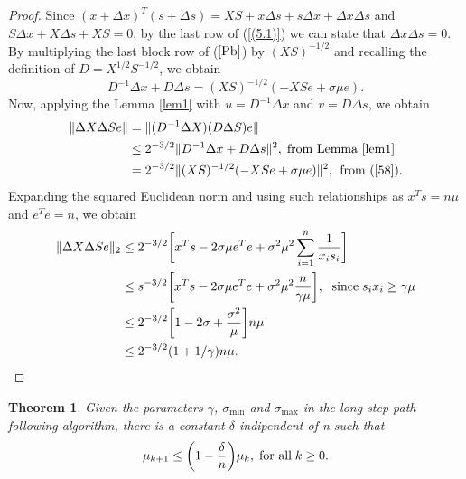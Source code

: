 \documentclass[a4paper,10 pt,titlepage,twoside]{book}
\theoremstyle{plain}
\newtheorem{thm}{Theorem}[chapter]
\theoremstyle{definition}
\theoremstyle{remark}
\begin{document}
\begin{proof}
	Since $(x + \Delta x)^{T}(s +\Delta s) = XS + x \Delta s + s \Delta x + \Delta x \Delta s$ and $S \Delta x + X \Delta s + XS = 0$, by the last row of (\ref{(5.1)}) we can state that $\Delta x\Delta s = 0$.\\
	By multiplying the last block row of ($\ref{Pb}$) by $(XS)^{-1/2}$ and recalling the definition of $D = X^{1/2}S^{-1/2}$, we obtain 
	\begin{equation}\label{58}
	D^{-1}\Delta x + D \Delta s = (XS)^{-1/2}(-XSe + \sigma \mu e).
	\end{equation}
	Now, applying the Lemma \ref{lem1} with $u= D^{-1}\Delta x$ and $v = D \Delta s$, we obtain
	\begin{align*}
	\lVert \Delta X \Delta S e\rVert &= \lVert(D^{-1}\Delta X)(D\Delta S)e \rVert \\
	&\leq 2^{-3/2}\lVert D^{-1}\Delta x + D \Delta s\rVert^{2}, \text{\;from Lemma \ref{lem1}}\\
	&= 2^{-3/2}\lVert (XS)^{-1/2}(-XSe + \sigma \mu e)\rVert ^{2} \text{,\; from (\ref{58})}.\\
	\end{align*}
	Expanding the squared Euclidean norm and using such relationships as $x^{T}s = n\mu$ and $e^{T}e = n$, we obtain
	\begin{align*}
	\lVert \Delta X \Delta S e\rVert_{2} &\leq 2^{-3/2}\bigg[x^{T}s - 2\sigma \mu e^{T}e + \sigma^{2}\mu^{2}\sum\limits_{i = 1}^{n}\frac{1}{x_{i}s_{i}}\bigg]\\
	&\leq s^{-3/2}\bigg[x^{T}s - 2\sigma \mu e^{T}e + \sigma^{2}\mu^{2}\frac{n}{\gamma \mu}\bigg], \text{\; since\;} s_{i}x_{i} \geq \gamma \mu\\
	&\leq 2^{-3/2}\bigg[1 - 2\sigma + \frac{\sigma^{2}}{\mu}\bigg]n \mu\\
	&\leq 2^{-3/2}(1 + 1/\gamma)n \mu.
	\end{align*}
\end{proof}
\begin{thm}
	Given the parameters $\gamma$, $\sigma_{\text{min}}$ and $\sigma_{\text{max}}$ in the long-step path following algorithm, there is a constant $\delta$ indipendent of n such that
	\begin{equation}\label{(5.10)}
	\mu_{k+1} \leq \bigg(1 - \frac{\delta}{n}\bigg)\mu_{k}, \text{\;for all\;}k\geq0.\\
	\end{equation} 
\end{thm}
\end{document}
